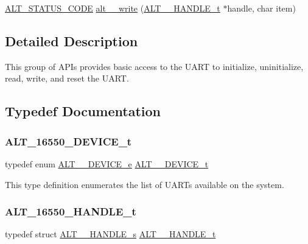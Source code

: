 \begin{DoxyCompactItemize}
\item 
\mbox{\hyperlink{hwlib_8h_abdb0d369f069723ca55d6c94bcaaaa12}{A\+L\+T\+\_\+\+S\+T\+A\+T\+U\+S\+\_\+\+C\+O\+DE}} \mbox{\hyperlink{group__UART__BASIC_gac16e07d06c432803c734854ab9789dcd}{alt\+\_\+\_\+write}} (\mbox{\hyperlink{group__UART__BASIC_ga4173f362f19fc04032c3859b78d78119}{A\+L\+T\+\_\+\_\+\+H\+A\+N\+D\+L\+E\+\_\+t}} $\ast$handle, char item)
\end{DoxyCompactItemize}


\subsection{Detailed Description}
This group of A\+P\+Is provides basic access to the U\+A\+RT to initialize, uninitialize, read, write, and reset the U\+A\+RT. 

\subsection{Typedef Documentation}
\mbox{\label{group__UART__BASIC_ga292038e1b11e0a1f05df98abd20c819b}} 
\subsubsection{\texorpdfstring{ALT\_16550\_DEVICE\_t}{ALT\_16550\_DEVICE\_t}}
{\footnotesize\ttfamily typedef enum \mbox{\hyperlink{group__UART__BASIC_gaaba218dfc8c12ed9a1204aede9a02ee7}{A\+L\+T\+\_\+\_\+\+D\+E\+V\+I\+C\+E\+\_\+e}}
 \mbox{\hyperlink{group__UART__BASIC_ga292038e1b11e0a1f05df98abd20c819b}{A\+L\+T\+\_\+\_\+\+D\+E\+V\+I\+C\+E\+\_\+t}}}

This type definition enumerates the list of U\+A\+R\+Ts available on the system. \mbox{\label{group__UART__BASIC_ga4173f362f19fc04032c3859b78d78119}} 
\subsubsection{\texorpdfstring{ALT\_16550\_HANDLE\_t}{ALT\_16550\_HANDLE\_t}}
{\footnotesize\ttfamily typedef struct \mbox{\hyperlink{structALT__16550__HANDLE__s}{A\+L\+T\+\_\+\_\+\+H\+A\+N\+D\+L\+E\+\_\+s}}
 \mbox{\hyperlink{group__UART__BASIC_ga4173f362f19fc04032c3859b78d78119}{A\+L\+T\+\_\+\_\+\+H\+A\+N\+D\+L\+E\+\_\+t}}}

